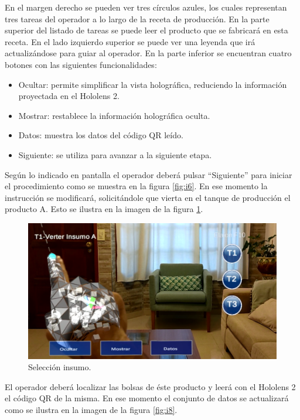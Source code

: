 En el margen derecho se pueden ver tres círculos azules, los cuales representan tres tareas del operador a lo largo de la receta de producción. En la parte superior del listado de tareas se puede leer el producto que se fabricará en esta receta. En el lado izquierdo superior se puede ver una leyenda que irá actualizándose para guiar al operador. En la parte inferior se encuentran cuatro botones con las siguientes funcionalidades:

\begin{itemize}
\item Ocultar: permite simplificar la vista holográfica, reduciendo la información proyectada en el Hololens 2.
\item Mostrar: restablece la información holográfica oculta.
\item Datos: muestra los datos del código QR leído.
\item Siguiente: se utiliza para avanzar a la siguiente etapa.
\end{itemize}

Según lo indicado en pantalla el operador deberá pulsar ``Siguiente'' para iniciar el procedimiento como se muestra en la figura \ref{fig:i6}. En ese momento la instrucción se modificará, solicitándole que vierta en el tanque de producción el producto A. Esto se ilustra en la imagen de la figura \ref{fig:i7}.

\begin{figure}[!htpb]
	\centering
	\includegraphics[scale=.4]{./Figures/i7.PNG}
	\caption{Selección insumo\protect\footnotemark.}
	\label{fig:i7}
\end{figure}

El operador deberá localizar las bolsas de éste producto y leerá con el Hololens 2 el código QR de la misma. En ese momento el conjunto de datos se actualizará como se ilustra en la imagen de la figura \ref{fig:i8}.

